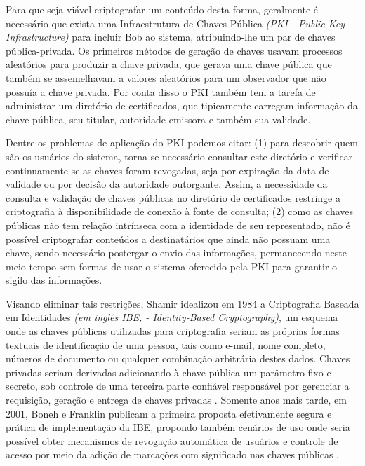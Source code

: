 \documentclass[a4paper,11pt]{article}
\begin{document}
Para que seja viável criptografar um conteúdo desta forma, geralmente é necessário que exista uma Infraestrutura de Chaves Pública \emph{(PKI - Public Key Infrastructure)} para incluir Bob ao sistema, atribuindo-lhe um par de chaves pública-privada.
Os primeiros métodos de geração de chaves usavam processos aleatórios para produzir a chave privada, que gerava uma chave pública que também se assemelhavam a valores aleatórios para um observador que não possuía a chave privada.
Por conta disso o PKI também tem a tarefa de administrar um diretório de certificados, que tipicamente carregam informação da chave pública, seu titular, autoridade emissora e também sua validade.

Dentre os problemas de aplicação do PKI podemos citar: (1) para descobrir quem são os usuários do sistema, torna-se necessário consultar este diretório e verificar continuamente se as chaves foram revogadas, seja por expiração da data de validade ou por decisão da autoridade outorgante. Assim, a necessidade da consulta e validação de chaves públicas no diretório de certificados restringe a criptografia à disponibilidade de conexão à fonte de consulta; (2) como as chaves públicas não tem relação intrínseca com a identidade de seu representado, não é possível criptografar conteúdos a destinatários que ainda não possuam uma chave, sendo necessário postergar o envio das informações, permanecendo neste meio tempo sem formas de usar o sistema oferecido pela PKI para garantir o sigilo das informações.

Visando eliminar tais restrições, Shamir idealizou em 1984 a Criptografia Baseada em Identidades \emph{(em inglês IBE, - Identity-Based Cryptography)}, um esquema onde as chaves públicas utilizadas para criptografia seriam as próprias formas textuais de identificação de uma pessoa, tais como e-mail, nome completo, números de documento ou qualquer combinação arbitrária destes dados.
Chaves privadas seriam derivadas adicionando à chave pública um parâmetro fixo e secreto, sob controle de uma terceira parte confiável responsável por gerenciar a requisição, geração e entrega de chaves privadas \cite{Shamir1985}.
Somente anos mais tarde, em 2001, Boneh e Franklin publicam a primeira proposta efetivamente segura e prática de implementação da IBE, propondo também cenários de uso onde seria possível obter mecanismos de revogação automática de usuários e controle de acesso por meio da adição de marcações com significado nas chaves públicas \cite{Boneh2001}.
\end{document}
